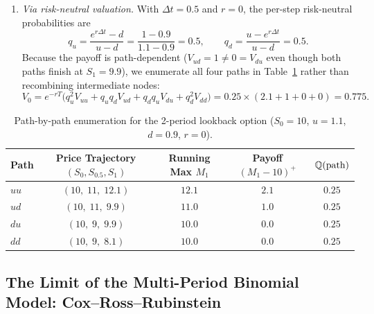\begin{example}
\begin{enumerate}
\begin{itemize}
        \item At node $S_0 = 10$, solving
        \[
            \begin{cases}
                \alpha_0 + 11 \beta_0 = 1.55, \\
                \alpha_0 + 9 \beta_0 = 0
            \end{cases}
        \]
        gives $\alpha_0 = -6.975$, $\beta_0 = 0.775$, and time-$0$ option price $V_0 = 0.775 \times 10 - 6.975 = 0.775$.
    \end{itemize}
    \item \emph{Via risk-neutral valuation.} With $\Delta t = 0.5$ and $r = 0$, the per-step risk-neutral probabilities are
    \[
        q_u = \frac{e^{r \Delta t} - d}{u - d} = \frac{1 - 0.9}{1.1 - 0.9} = 0.5, \qquad q_d = \frac{u - e^{r \Delta t}}{u - d} = 0.5.
    \]
    Because the payoff is path-dependent ($V_{ud} = 1 \neq 0 = V_{du}$ even though both paths finish at $S_1 = 9.9$), we enumerate all four paths in Table~\ref{tab:lookback_paths} rather than recombining intermediate nodes:
    \[
        V_0 = e^{-rT}\bigl(q_u^2 V_{uu} + q_u q_d V_{ud} + q_d q_u V_{du} + q_d^2 V_{dd}\bigr) = 0.25 \times (2.1 + 1 + 0 + 0) = 0.775.
    \]
\end{enumerate}

\begin{table}[!ht]
    \centering
    \caption{Path-by-path enumeration for the 2-period lookback option ($S_0 = 10$, $u = 1.1$, $d = 0.9$, $r = 0$).}
    \label{tab:lookback_paths}
    \begin{tabular}{lcccc}
        \toprule
        Path & Price Trajectory $(S_0, S_{0.5}, S_1)$ & Running Max $M_1$ & Payoff $(M_1 - 10)^+$ & $\mathbb{Q}(\text{path})$ \\
        \midrule
        $uu$ & $(10,\; 11,\; 12.1)$ & $12.1$ & $2.1$ & $0.25$ \\
        $ud$ & $(10,\; 11,\; 9.9)$  & $11.0$ & $1.0$ & $0.25$ \\
        $du$ & $(10,\; 9,\; 9.9)$   & $10.0$ & $0.0$ & $0.25$ \\
        $dd$ & $(10,\; 9,\; 8.1)$   & $10.0$ & $0.0$ & $0.25$ \\
        \bottomrule
    \end{tabular}
\end{table}
\end{example}

\subsection*{The Limit of the Multi-Period Binomial Model: Cox--Ross--Rubinstein}

